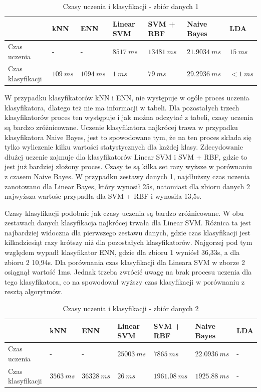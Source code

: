 \documentclass[[10pt,a4paper]{article}
\begin{document}
\begin{table}[h]
\centering
\caption{Czasy uczenia i klasyfikacji - zbiór danych 1}
\label{timesTable1}
\begin{tabular}{l|l|l|l|l|l|l|}
\cline{2-7}
                                        & kNN & ENN & Linear SVM & SVM + RBF & Naive Bayes & LDA \\ \hline
\multicolumn{1}{|l|}{Czas uczenia}      &  -  &  -   &  $8517\: ms$   &   $13481\: ms$   &   $21.9034\: ms$ & $15\: ms$    \\ \hline
\multicolumn{1}{|l|}{Czas klasyfikacji} &  $109 \: ms$   &   $1094\: ms$   &   $1\: ms$  &      $79\: ms$     &     $29.2936\: ms$        & $< 1\: ms$  \\ \hline
\end{tabular}
\end{table}

W przypadku klasyfikatorów kNN i ENN, nie występuje w ogóle proces uczenia klasyfikatora, dlatego też nie ma informacji w tabeli. Dla pozostałych trzech klasyfikatorów proces ten występuje i jak można odczytać z tabeli, czasy uczenia są bardzo zróżnicowane. Uczenie klasyfikatora najkrócej trawa w przypadku klasyfikatora Naive Bayes, jest to spowodowane tym, że na ten proces składa się tylko wyliczenie kilku wartości statystycznych dla każdej klasy. Zdecydowanie dłużej uczenie zajmuje dla klasyfikatorów Linear SVM i SVM + RBF, gdzie to jest już bardziej złożony proces. Czasy te są kilka set razy wyższe w porównaniu z czasem Naive Bayes. W przypadku zestawy danych 1, najdłuższy czas uczenia zanotowano dla Linear Bayes, który wynosił 25s, natomiast dla zbioru danych 2 najwyższa wartośc przypadła dla SVM + RBF i wynosiła 13,5s. 

Czasy klasyfikacji podobnie jak czasy uczenia są bardzo zróżnicowane. W obu zestawach danych klasyfikacja najkrócej trwała dla Linear SVM. Różnica ta jest najbardziej widoczna dla pierwszego zestawu danych, gdzie czas klasyfikacji jest kilkadziesiąt razy krótszy niż dla pozostałych klasyfikatorów. Najgorzej pod tym względem wypadł klasyfikator ENN, gdzie dla zbioru 1 wyniósł 36,33s, a dla zbioru 2 10,94s. Dla porównania czas klasyfikacji dla Lineara SVM w zborze 2 osiągnął wartość 1ms. Jednak trzeba zwrócić uwagę na brak procesu uczenia dla tego klasyfikatora, co na spowodował wyższy czas klasyfikacji w porównaniu z resztą algorytmów. 


\begin{table}[h]
\centering
\caption{Czasy uczenia i klasyfikacji  - zbiór danych 2}
\label{timesTable2}
\begin{tabular}{l|l|l|l|l|l|l|}
\cline{2-7}
                                        & kNN & ENN & Linear SVM & SVM + RBF & Naive Bayes & LDA \\ \hline
\multicolumn{1}{|l|}{Czas uczenia}      &  -  &  -   &  $25003\: ms$   &   $7865\: ms$   &   $22.0936 \: ms$ & -    \\ \hline
\multicolumn{1}{|l|}{Czas klasyfikacji} &  $3563 \: ms$   &   $36328\: ms$   &   $26\: ms$  &      $1961.08\: ms$     &     $1925.88\: ms$        & - \\ \hline
\end{tabular}
\end{table}
\end{document}
